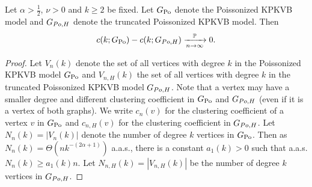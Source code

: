 \begin{lemma}\label{lem:trunc}
Let $\alpha>\frac{1}{2}$, $\nu>0$ and $k \geq 2$ be fixed. Let $G_{\text{Po}}$ denote the Poissonized KPKVB model and $G_{Po,H}$ denote the truncated Poissonized KPKVB model. Then 
$$c(k;G_{\text{Po}})-c(k;G_{Po,H}) \xrightarrow[n \rightarrow \infty]{\mathbb{P}} 0.$$
\end{lemma}
\begin{proof}
Let $V_n(k)$ denote the set of all vertices with degree $k$ in the Poissonized KPKVB model $G_{\text{Po}}$ and $V_{n,H}(k)$ the set of all vertices with degree $k$ in the truncated Poissonized KPKVB model $G_{Po,H}$. Note that a vertex may have a smaller degree and different clustering coefficient in $G_{\text{Po}}$ and $G_{Po,H}$ (even if it is a vertex of both graphs). We write $c_n(v)$ for the clustering coefficient of a vertex $v$ in $G_{\text{Po}}$ and $c_{n,H}(v)$ for the clustering coefficient in $G_{Po,H}$. Let $N_n(k)=|V_n(k)|$ denote the number of degree $k$ vertices in $G_{\text{Po}}$. Then as $N_n(k) = \Theta(n k^{-(2\alpha+1)})$ a.a.s., there is a constant $a_1(k)>0$ such that a.a.s. $N_n(k) \geq a_1(k) n$. Let $N_{n,H}(k) = |V_{n,H}(k)|$ be the number of degree $k$ vertices in $G_{Po,H}$.


\end{proof}
